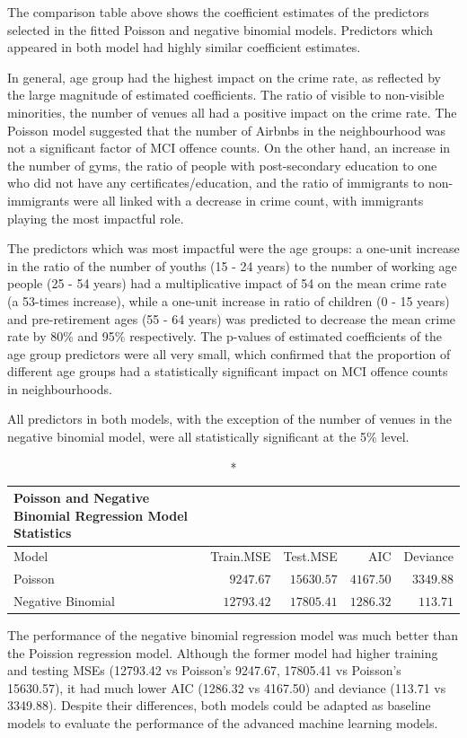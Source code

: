 \documentclass[
]{article}
\begin{document}
The comparison table above shows the coefficient estimates of the
predictors selected in the fitted Poisson and negative binomial models.
Predictors which appeared in both model had highly similar coefficient
estimates.

In general, age group had the highest impact on the crime rate, as
reflected by the large magnitude of estimated coefficients. The ratio of
visible to non-visible minorities, the number of venues all had a
positive impact on the crime rate. The Poisson model suggested that the
number of Airbnbs in the neighbourhood was not a significant factor of
MCI offence counts. On the other hand, an increase in the number of
gyms, the ratio of people with post-secondary education to one who did
not have any certificates/education, and the ratio of immigrants to
non-immigrants were all linked with a decrease in crime count, with
immigrants playing the most impactful role.

The predictors which was most impactful were the age groups: a one-unit
increase in the ratio of the number of youths (15 - 24 years) to the
number of working age people (25 - 54 years) had a multiplicative impact
of 54 on the mean crime rate (a 53-times increase), while a one-unit
increase in ratio of children (0 - 15 years) and pre-retirement ages (55
- 64 years) was predicted to decrease the mean crime rate by 80\% and
95\% respectively. The p-values of estimated coefficients of the age
group predictors were all very small, which confirmed that the
proportion of different age groups had a statistically significant
impact on MCI offence counts in neighbourhoods.

All predictors in both models, with the exception of the number of
venues in the negative binomial model, were all statistically
significant at the 5\% level.

\begin{longtable}{lrrrr}
\caption*{
{\large Poisson and Negative Binomial Regression Model Statistics}
} \\ 
\toprule
Model & Train.MSE & Test.MSE & AIC & Deviance \\ 
\midrule
Poisson & $9247.67$ & $15630.57$ & $4167.50$ & $3349.88$ \\ 
Negative Binomial & $12793.42$ & $17805.41$ & $1286.32$ & $113.71$ \\ 
\bottomrule
\end{longtable}

The performance of the negative binomial regression model was much
better than the Poission regression model. Although the former model had
higher training and testing MSEs (12793.42 vs Poisson's 9247.67,
17805.41 vs Poisson's 15630.57), it had much lower AIC (1286.32 vs
4167.50) and deviance (113.71 vs 3349.88). Despite their differences,
both models could be adapted as baseline models to evaluate the
performance of the advanced machine learning models.
\end{document}
